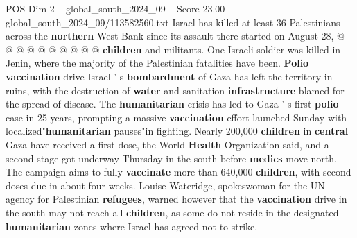 \begin{textsample}{POS Dim 2 – global\_south\_2024\_09 – Score 23.00 – global\_south\_2024\_09/113582560.txt}
Israel has killed at least 36 Palestinians across the \textbf{northern} West Bank since its assault there started on August 28, @ @ @ @ @ @ @ @ @ @ \textbf{children} and militants.
One Israeli soldier was killed in Jenin, where the majority of the Palestinian fatalities have been. \textbf{Polio} \textbf{vaccination} drive Israel ' s \textbf{bombardment} of Gaza has left the territory in ruins, with the destruction of \textbf{water} and sanitation \textbf{infrastructure} blamed for the spread of disease.
The \textbf{humanitarian} crisis has led to Gaza ' s first \textbf{polio} case in 25 years, prompting a massive \textbf{vaccination} effort launched Sunday with localized"\textbf{humanitarian} pauses"in fighting.
Nearly 200,000 \textbf{children} in \textbf{central} Gaza have received a first dose, the World \textbf{Health} Organization said, and a second stage got underway Thursday in the south before \textbf{medics} move north.
The campaign aims to fully \textbf{vaccinate} more than 640,000 \textbf{children}, with second doses due in about four weeks.
Louise Wateridge, spokeswoman for the UN agency for Palestinian \textbf{refugees}, warned however that the \textbf{vaccination} drive in the south may not reach all \textbf{children}, as some do not reside in the designated \textbf{humanitarian} zones where Israel has agreed not to strike.

\end{textsample}

